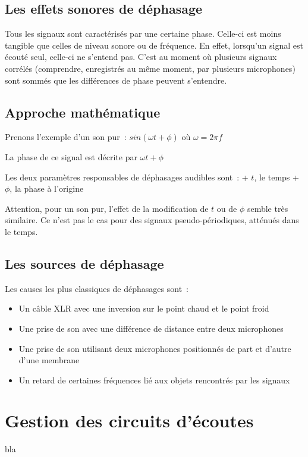 \documentclass[
]{book}
\providecommand{\tightlist}{%
  \setlength{\itemsep}{0pt}\setlength{\parskip}{0pt}}
\begin{document}
\hypertarget{les-effets-sonores-de-duxe9phasage}{%
\section{Les effets sonores de déphasage}\label{les-effets-sonores-de-duxe9phasage}}

Tous les signaux sont caractérisés par une certaine phase. Celle-ci est moins tangible que celles de niveau sonore ou de fréquence. En effet, lorsqu'un signal est écouté seul, celle-ci ne s'entend pas. C'est au moment où plusieurs signaux corrélés (comprendre, enregistrés au même moment, par plusieurs microphones) sont sommés que les différences de phase peuvent s'entendre.

\hypertarget{approche-mathuxe9matique}{%
\section{Approche mathématique}\label{approche-mathuxe9matique}}

Prenons l'exemple d'un son pur~:
\(sin (\omega t + \phi)\) où \(\omega = 2\pi f\)

La phase de ce signal est décrite par \(\omega t +\phi\)

Les deux paramètres responsables de déphasages audibles sont~:
+ \(t\), le temps
+ \(\phi\), la phase à l'origine

Attention, pour un son pur, l'effet de la modification de \(t\) ou de \(\phi\) semble très similaire. Ce n'est pas le cas pour des signaux pseudo-périodiques, atténués dans le temps.

\hypertarget{les-sources-de-duxe9phasage}{%
\section{Les sources de déphasage}\label{les-sources-de-duxe9phasage}}

Les causes les plus classiques de déphasages sont~:

\begin{itemize}
\tightlist
\item
  Un câble XLR avec une inversion sur le point chaud et le point froid
\item
  Une prise de son avec une différence de distance entre deux microphones
\item
  Une prise de son utilisant deux microphones positionnés de part et d'autre d'une membrane
\item
  Un retard de certaines fréquences lié aux objets rencontrés par les signaux
\end{itemize}

\hypertarget{gestion-des-circuits-duxe9coutes}{%
\chapter{Gestion des circuits d'écoutes}\label{gestion-des-circuits-duxe9coutes}}

bla
\end{document}
